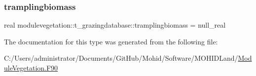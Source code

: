 \subsubsection{\texorpdfstring{tramplingbiomass}{tramplingbiomass}}
{\footnotesize\ttfamily real modulevegetation\+::t\+\_\+grazingdatabase\+::tramplingbiomass = null\+\_\+real\hspace{0.3cm}{\ttfamily [private]}}



The documentation for this type was generated from the following file\+:\begin{DoxyCompactItemize}
\item 
C\+:/\+Users/administrator/\+Documents/\+Git\+Hub/\+Mohid/\+Software/\+M\+O\+H\+I\+D\+Land/\mbox{\hyperlink{_module_vegetation_8_f90}{Module\+Vegetation.\+F90}}\end{DoxyCompactItemize}
